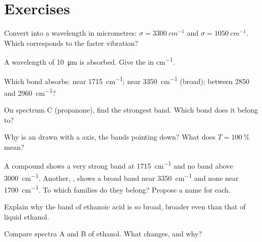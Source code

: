 \section{Exercises}

\begin{exercise}[$\star$]\label{exo:g11:infrared:1}
Convert into a wavelength in micrometres: $\sigma = \qty{3300}{cm^{-1}}$
and $\sigma = \qty{1050}{cm^{-1}}$. Which corresponds to the faster
vibration?
\end{exercise}

\begin{exercise}[$\star$]\label{exo:g11:infrared:2}
A wavelength of \qty{10}{\micro m} is absorbed. Give the  in
\si{cm^{-1}}.
\end{exercise}

\begin{exercise}[$\star$]\label{exo:g11:infrared:3}
Which bond absorbs: near \qty{1715}{cm^{-1}}; near \qty{3350}{cm^{-1}}
(broad); between 2850 and \qty{2960}{cm^{-1}}?
\end{exercise}

\begin{exercise}[$\star$]\label{exo:g11:infrared:4}
On spectrum C (propanone), find the strongest band. Which bond does it
belong to?
\end{exercise}

\begin{exercise}[$\star$]\label{exo:g11:infrared:5}
Why is an  drawn with a  axis, the bands
pointing down? What does $T = \qty{100}{\percent}$ mean?
\end{exercise}

\begin{exercise}[$\star\star$]\label{exo:g11:infrared:6}
A compound  shows a very strong band at
\qty{1715}{cm^{-1}} and no band above \qty{3000}{cm^{-1}}. Another,
, shows a broad band near \qty{3350}{cm^{-1}} and none near
\qty{1700}{cm^{-1}}. To which families do they belong? Propose a name
for each.
\end{exercise}

\begin{exercise}[$\star\star$]\label{exo:g11:infrared:7}
Explain why the  band of ethanoic acid is so broad, broader even
than that of liquid ethanol.
\end{exercise}

\begin{exercise}[$\star\star$]\label{exo:g11:infrared:8}
Compare spectra A and B of ethanol. What changes, and why?
\end{exercise}

